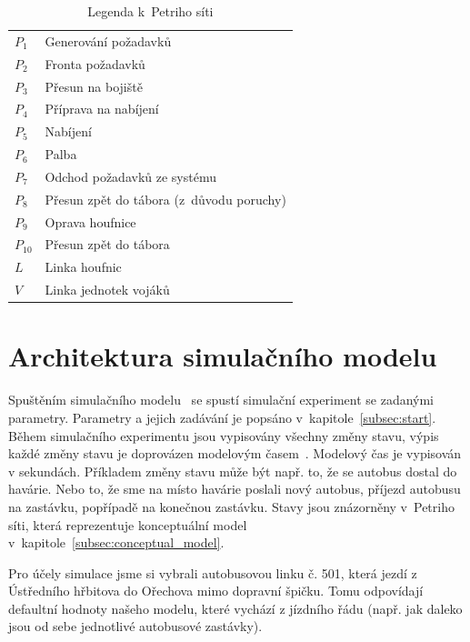 \documentclass[a4paper]{article}
\begin{document}
            \begin{table}[H]
                \centering
                \begin{tabular}{ l l }
                    $P_1$ & Generování požadavků \\
                    $P_2$ & Fronta požadavků \\
                    $P_3$ & Přesun na bojiště \\
                    $P_4$ & Příprava na nabíjení \\
                    $P_5$ & Nabíjení \\
                    $P_6$ & Palba \\
                    $P_7$ & Odchod požadavků ze systému \\
                    $P_8$ & Přesun zpět do tábora (z~důvodu poruchy) \\
                    $P_9$ & Oprava houfnice \\
                    $P_{10}$ & Přesun zpět do tábora \\
                    $L$ & Linka houfnic \\
                    $V$ & Linka jednotek vojáků
                \end{tabular}
                \caption{Legenda k~Petriho síti}
                \label{tab:petri}
            \end{table}

    \section{Architektura simulačního modelu}
    \label{sec:architecture}

        Spuštěním simulačního modelu~\cite[snímek 44]{IMS_slides} se spustí simulační experiment se zadanými parametry.
        Parametry a jejich zadávání je popsáno v~kapitole~\ref{subsec:start}. Během simulačního experimentu jsou vypisovány všechny změny stavu,
        výpis každé změny stavu je doprovázen modelovým časem~\cite[snímek 21]{IMS_slides}. Modelový čas je vypisován v sekundách. Příkladem změny stavu může být např. to, že se autobus dostal do havárie. Nebo to, že sme na místo havárie poslali nový autobus, příjezd autobusu na zastávku, popřípadě na konečnou zastávku. Stavy jsou znázorněny v~Petriho síti,
        která reprezentuje konceptuální model v~kapitole~\ref{subsec:conceptual_model}.

        Pro účely simulace jsme si vybrali autobusovou linku č. 501, která jezdí z Ústředního hřbitova do Ořechova mimo dopravní špičku. Tomu odpovídají defaultní hodnoty našeho modelu, které vychází z jízdního řádu (např. jak daleko jsou od sebe jednotlivé autobusové zastávky).
\end{document}
